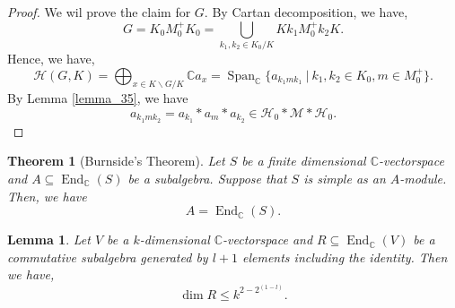 \documentclass[8pt]{article}
\newtheorem{theorem}{Theorem} [section]
\newtheorem{lemma}{Lemma}[section]
\DeclareMathOperator{\End}{End}
\DeclareMathOperator{\Span}{Span}
\newcommand{\C}[0]{\mathbb{C}}
\newcommand{\sep}[0]{\:|\:}
\newcommand{\hecke}[0]{\mathscr{H}}
\begin{document}
\begin{proof}
  We wil prove the claim for $G$. By Cartan decomposition, we have,
  \begin{equation*}
    G = K_0M_0^+K_0 = \bigcup_{k_1,k_2\in K_0/K}Kk_1M_0^+k_2K.
  \end{equation*}
  Hence, we have,
  \begin{equation*}
    \hecke(G,K) = \bigoplus_{x\in K\backslash G/K}\C a_x = \Span_\C\{a_{k_1mk_1}\sep k_1,k_2\in K_0,m\in M_0^+\}.
  \end{equation*}
  By Lemma \ref{lemma_35}, we have 
  \begin{equation*}
    a_{k_1mk_2} = a_{k_1}\ast a_m \ast a_{k_2}\in\hecke_0\ast\mathcal{M}\ast\hecke_0.
  \end{equation*}
\end{proof}

\begin{theorem}[Burnside's Theorem]
  \label{theorem_burnsides}
  Let $S$ be a finite dimensional $\C$-vectorspace and $A\subseteq \End_\C(S)$ be a subalgebra. Suppose that $S$ is simple as an $A$-module.
  Then, we have 
  \begin{equation*}
    A = \End_\C(S).
  \end{equation*}
\end{theorem}

\begin{lemma}
  \label{lemma_39}
  Let $V$ be a $k$-dimensional $\C$-vectorspace and $R\subseteq\End_\C(V)$ be a commutative subalgebra generated by $l+1$ elements including the identity. Then we have,
  \begin{equation*}
    \dim R \leq k^{2-2^{(1-l)}}.
  \end{equation*}
\end{lemma}
\end{document}
